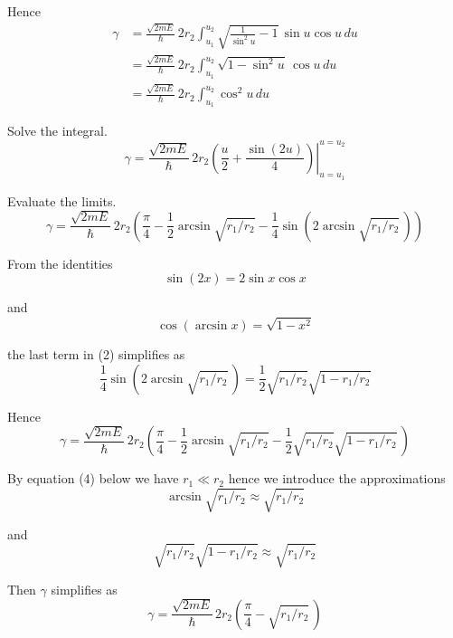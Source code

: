 Hence
\begin{align*}
\gamma&=\frac{\sqrt{2mE}}{\hbar}\,2r_2\int_{u_1}^{u_2}
\sqrt{\frac{1}{\sin^2u}-1}\,\sin u\cos u\,du
\\[1ex]
&=\frac{\sqrt{2mE}}{\hbar}\,2r_2\int_{u_1}^{u_2}\sqrt{1-\sin^2u}\,\cos u\,du
\\[1ex]
&=\frac{\sqrt{2mE}}{\hbar}\,2r_2\int_{u_1}^{u_2}\cos^2u\,du
\end{align*}

Solve the integral.
\begin{equation*}
\gamma=\left.
\frac{\sqrt{2mE}}{\hbar}\,2r_2\left(\frac{u}{2}+\frac{\sin(2u)}{4}\right)
\right|_{u=u_1}^{u=u_2}
\tag{1}
\end{equation*}

Evaluate the limits.
\begin{equation*}
\gamma=\frac{\sqrt{2mE}}{\hbar}\,2r_2
\left(
\frac{\pi}{4}
-\frac{1}{2}\arcsin\sqrt{r_1/r_2}
-\frac{1}{4}\sin\left(2\arcsin\sqrt{r_1/r_2}\,\right)
\right)
\tag{2}
\end{equation*}

From the identities
\begin{equation*}
\sin(2x)=2\sin x\cos x
\end{equation*}

and
\begin{equation*}
\cos(\arcsin x)=\sqrt{1-x^2}
\end{equation*}

the last term in (2) simplifies as
\begin{equation*}
\frac{1}{4}\sin\left(2\arcsin\sqrt{r_1/r_2}\,\right)
=\frac{1}{2}\sqrt{r_1/r_2}\sqrt{1-r_1/r_2}
\end{equation*}

Hence
\begin{equation*}
\gamma=\frac{\sqrt{2mE}}{\hbar}\,2r_2
\left(
\frac{\pi}{4}
-\frac{1}{2}\arcsin\sqrt{r_1/r_2}
-\frac{1}{2}\sqrt{r_1/r_2}\sqrt{1-r_1/r_2}\,
\right)
\end{equation*}

By equation (4) below we have $r_1\ll r_2$
hence we introduce the approximations
\begin{equation*}
\arcsin\sqrt{r_1/r_2}\approx\sqrt{r_1/r_2}
\end{equation*}

and
\begin{equation*}
\sqrt{r_1/r_2}\sqrt{1-r_1/r_2}\approx\sqrt{r_1/r_2}
\end{equation*}

Then $\gamma$ simplifies as
\begin{equation*}
\gamma=\frac{\sqrt{2mE}}{\hbar}\,2r_2
\left(
\frac{\pi}{4}
-\sqrt{r_1/r_2}\,
\right)
\end{equation*}


